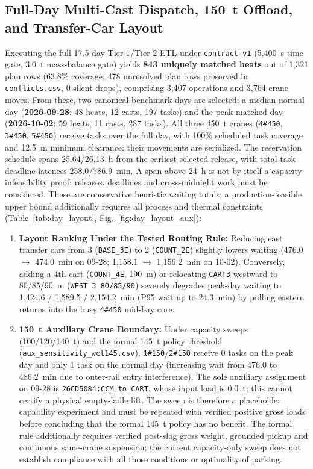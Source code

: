 \documentclass[11pt,a4paper]{article}
\begin{document}
\subsection{Full-Day Multi-Cast Dispatch, 150~t Offload, and Transfer-Car Layout}
Executing the full 17.5-day Tier-1/Tier-2 ETL under \texttt{contract-v1} (5,400~s time gate, 3.0~t mass-balance gate) yields \textbf{843 uniquely matched heats} out of 1,321 plan rows (63.8\% coverage; 478 unresolved plan rows preserved in \texttt{conflicts.csv}, 0 silent drops), comprising 3,407 operations and 3,764 crane moves. From these, two canonical benchmark days are selected: a median normal day (\textbf{2026-09-28}: 48 heats, 12 casts, 197 tasks) and the peak matched day (\textbf{2026-10-02}: 59 heats, 11 casts, 287 tasks). All three 450~t cranes (\texttt{4\#450}, \texttt{3\#450}, \texttt{5\#450}) receive tasks over the full day, with 100\% scheduled task coverage and 12.5~m minimum clearance; their movements are serialized. The reservation schedule spans 25.64/26.13~h from the earliest selected release, with total task-deadline lateness 258.0/786.9~min. A span above 24~h is not by itself a capacity infeasibility proof: releases, deadlines and cross-midnight work must be considered. These are conservative heuristic waiting totals; a production-feasible upper bound additionally requires all process and thermal constraints (Table~\ref{tab:day_layout}, Fig.~\ref{fig:day_layout_aux}):
\begin{enumerate}[leftmargin=1.5em,itemsep=2pt]
  \item \textbf{Layout Ranking Under the Tested Routing Rule:} Reducing east transfer cars from 3 (\texttt{BASE\_3E}) to 2 (\texttt{COUNT\_2E}) slightly lowers waiting (476.0 $\rightarrow$ 474.0~min on 09-28; 1,158.1 $\rightarrow$ 1,156.2~min on 10-02). Conversely, adding a 4th cart (\texttt{COUNT\_4E}, 190~m) or relocating \texttt{CART3} westward to 80/85/90~m (\texttt{WEST\_3\_80/85/90}) severely degrades peak-day waiting to 1,424.6 / 1,589.5 / 2,154.2~min (P95 wait up to 24.3~min) by pulling eastern returns into the busy \texttt{4\#450} mid-bay core.
  \item \textbf{150~t Auxiliary Crane Boundary:} Under capacity sweeps (100/120/140~t) and the formal 145~t policy threshold (\texttt{aux\_sensitivity\_wcl145.csv}), \texttt{1\#150}/\texttt{2\#150} receive 0 tasks on the peak day and only 1 task on the normal day (increasing wait from 476.0 to 486.2~min due to outer-rail entry interference). The sole auxiliary assignment on 09-28 is \texttt{26CD5084:CCM\_to\_CART}, whose input load is 0.0~t; this cannot certify a physical empty-ladle lift. The sweep is therefore a placeholder capability experiment and must be repeated with verified positive gross loads before concluding that the formal 145~t policy has no benefit. The formal rule additionally requires verified post-slag gross weight, grounded pickup and continuous same-crane suspension; the current capacity-only sweep does not establish compliance with all those conditions or optimality of parking.
\end{enumerate}
\end{document}
